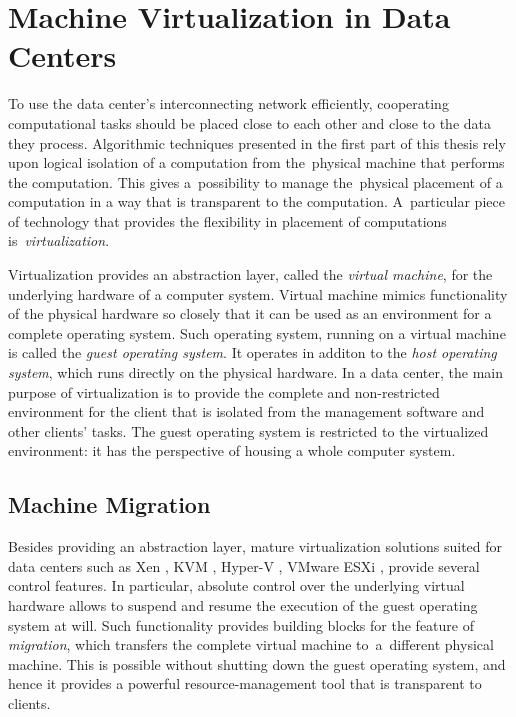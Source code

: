 \section{Machine Virtualization in Data Centers}
\label{sec:intro-machine-virtualization}

To use the data center's interconnecting network efficiently, cooperating computational tasks should be placed close to each other and close to the data they process.
Algorithmic techniques presented in the first part of this thesis rely upon logical isolation of a computation from the~physical machine that performs the computation.
This gives a~possibility to manage the~physical placement of a computation in a way that is transparent to the computation.
A~particular piece of technology that provides the flexibility in placement of computations is~\emph{virtualization}.

Virtualization provides an abstraction layer, called the \emph{virtual machine}, for the underlying hardware of a computer system.
Virtual machine mimics functionality of the physical hardware so closely that it can be used as an environment for a complete operating system.
Such operating system, running on a virtual machine is called the \emph{guest
operating system}. It operates in additon to the \emph{host operating
system}, which runs directly on the physical hardware. 
In a data center, the main purpose of virtualization is to provide the complete and non-restricted environment for the client that is isolated from the management software and other clients' tasks.
The guest operating system is restricted to the virtualized environment: it has the perspective of housing a whole computer system.


\subsection{Machine Migration}

Besides providing an abstraction layer, mature virtualization solutions suited for data centers such as Xen
\cite{url-xen}, KVM \cite{url-kvm}, Hyper-V \cite{url-hyperv}, VMware ESXi
\cite{url-vmware}, provide several control features.
In particular, absolute control over the underlying virtual hardware allows to suspend and resume the execution of the guest operating system at will.
Such functionality provides building blocks for the feature of \emph{migration}, which transfers the complete virtual machine to~a~different physical machine.
This is possible without shutting down the guest operating system, and hence it provides a powerful resource-management tool that is transparent to clients.

